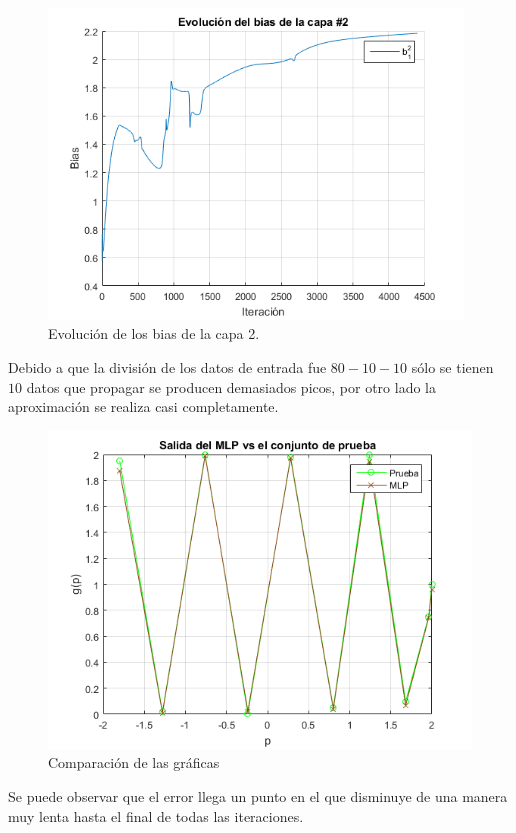 \begin{figure}[H]
    \begin{center}
        \includegraphics[width=11cm]{1/bias2.png}
        \caption{Evolución de los bias de la capa 2.}
        \label{fig:bias2}
    \end{center}
\end{figure}
Debido a que la división de los datos de entrada fue $80-10-10$ sólo se tienen $10$ datos que propagar se producen demasiados picos, por otro lado la aproximación se realiza casi completamente.
\begin{figure}[H]
    \begin{center}
        \includegraphics[width=12cm]{1/prueba.png}
        \caption{Comparación de las gráficas}
        \label{fig:prueba1}
    \end{center}
\end{figure}
Se puede observar que el error llega un punto en el que disminuye de una manera muy lenta hasta el final de todas las iteraciones.
